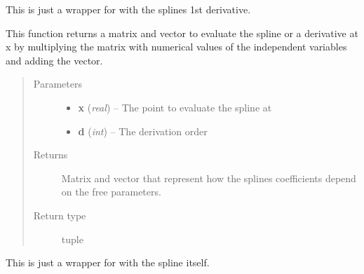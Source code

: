 \documentclass[letterpaper,10pt,english]{sphinxmanual}
\begin{document}
\begin{fulllineitems}
\begin{fulllineitems}
\end{fulllineitems}


\begin{fulllineitems}
\label{pytrajectory:pytrajectory.spline.CubicSpline.tmp_df}
This is just a wrapper for {\hyperref[pytrajectory:pytrajectory.spline.CubicSpline.tmp_evalf]{}} with the splines 1st derivative.

\end{fulllineitems}


\begin{fulllineitems}
\label{pytrajectory:pytrajectory.spline.CubicSpline.tmp_evalf}
This function returns a matrix and vector to evaluate the spline or a derivative at x
by multiplying the matrix with numerical values of the independent variables
and adding the vector.
\begin{quote}\begin{description}
\item[{Parameters}] \leavevmode\begin{itemize}
\item {} 
\textbf{x} (\emph{real}) -- The point to evaluate the spline at

\item {} 
\textbf{d} (\emph{int}) -- The derivation order

\end{itemize}

\item[{Returns}] \leavevmode
Matrix and vector that represent how the splines coefficients depend on the free parameters.

\item[{Return type}] \leavevmode
tuple

\end{description}\end{quote}

\end{fulllineitems}


\begin{fulllineitems}
\label{pytrajectory:pytrajectory.spline.CubicSpline.tmp_f}
This is just a wrapper for {\hyperref[pytrajectory:pytrajectory.spline.CubicSpline.tmp_evalf]{}} with the spline itself.

\end{fulllineitems}


\end{fulllineitems}
\end{document}

